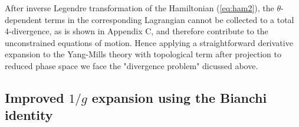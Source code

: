 \documentclass[a4paper,12pt]{article}
\begin{document}
After inverse Legendre transformation of the Hamiltonian (\ref{eq:ham2}),
the $\theta$-dependent terms in the corresponding Lagrangian
cannot be collected to a total 4-divergence, as is shown in Appendix C,
and therefore contribute to the unconstrained equations of motion.
Hence applying a straightforward derivative expansion to the
Yang-Mills theory with topological term after projection to reduced phase
space we face the "divergence problem" dicussed above.


\subsection{Improved $1/g$ expansion using the Bianchi identity}

\label{SECTIONIV2}
\end{document}
